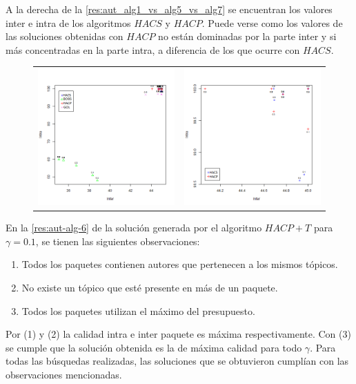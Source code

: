 A la derecha de la \autoref{res:aut_alg1_vs_alg5_vs_alg7} se encuentran los valores inter e intra de los algoritmos $HACS$ y $HACP$. Puede verse como los valores de las soluciones obtenidas con $HACP$ no están dominadas por la parte inter y si más concentradas en la parte intra, a diferencia de los que ocurre con $HACS$.

\begin{figure}[H]
	\centering
	\begin{tabular}{cc}
			\includegraphics[width=0.45\linewidth]{img/aut-alg1-alg2-alg5-alg7.png}&
			\includegraphics[width=0.45\linewidth]{img/aut-alg1-alg5.png}\\
	\end{tabular}
	\caption{}
	\label{res:aut_alg1_vs_alg5_vs_alg7}
\end{figure}


En la \autoref{res:aut-alg-6} de la solución generada por el algoritmo $HACP+T$ para $\gamma = 0.1$, se tienen las siguientes observaciones:
\begin{enumerate}
	\item Todos los paquetes contienen autores que pertenecen a los mismos tópicos. 
	\item No existe un tópico que esté presente en más de un paquete.
	\item Todos los paquetes utilizan el máximo del presupuesto.
\end{enumerate}
Por (1) y (2) la calidad intra e inter paquete es máxima respectivamente. Con (3) se cumple que la solución obtenida es la de máxima calidad para todo $\gamma$. Para todas las búsquedas realizadas, las soluciones que se obtuvieron cumplían con las observaciones mencionadas.

